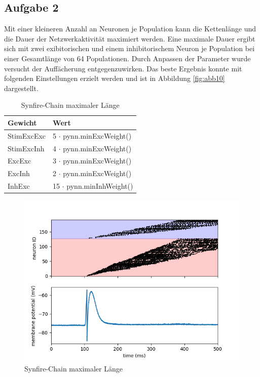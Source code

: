 \documentclass[10pt,a4paper]{scrartcl}
\begin{document}
\newpage 


\subsection{Aufgabe 2}
Mit einer kleineren Anzahl an Neuronen je Population kann die Kettenlänge und die Dauer der Netzwerkaktivität maximiert werden. Eine maximale Dauer 
ergibt sich mit zwei exibitorischen und einem inhibitorischem Neuron je Population bei einer Gesamtlänge von 64 Populationen. Durch Anpassen der Parameter wurde versucht der Auffächerung entgegenzuwirken. Das beste Ergebnis konnte mit folgenden Einstellungen erzielt werden und ist in Abbildung \ref{fig:abb10} dargestellt.

\begin{table}[H]
\centering
\captionsetup{justification=centering}
\caption{Synfire-Chain maximaler Länge}
\begin{tabular}{l|l}
 Gewicht&Wert\\
\hline
StimExcExc&5 $\cdot$ pynn.minExcWeight()\\
StimExcInh&4 $\cdot$ pynn.minExcWeight()\\
ExcExc&3 $\cdot$ pynn.minExcWeight()\\
ExcInh&2 $\cdot$ pynn.minExcWeight()\\
InhExc&15 $\cdot$ pynn.minInhWeight()
\end{tabular}
\label{tab:07}
\end{table}

\begin{figure} [ht]
\begin{center}
\label{fig:abb4}
\caption{Synfire-Chain maximaler Länge}
\includegraphics[scale=0.35]{pictures/chainlength_64.png}
\end{center}
\end{figure}
\end{document}
